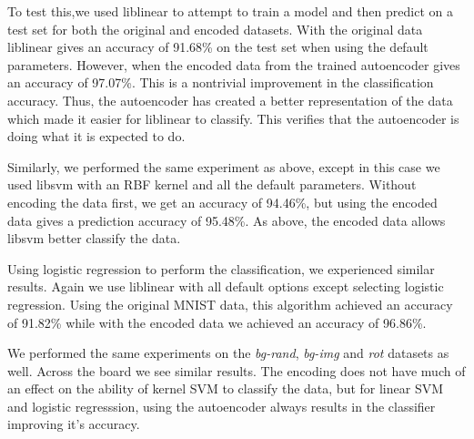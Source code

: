 To test this,we used liblinear to attempt to train a model and then predict on
a test set for both the original and encoded datasets. With the original data
liblinear gives an accuracy of 91.68\% on the test set when using the default
parameters. However, when the encoded data from the trained autoencoder gives
an accuracy of 97.07\%. This is a nontrivial improvement in the classification
accuracy. Thus, the autoencoder has created a better representation of the data
which made it easier for liblinear to classify. This verifies that the
autoencoder is doing what it is expected to do.

Similarly, we performed the same experiment as above, except in this case we
used libsvm with an RBF kernel and all the default parameters.  Without
encoding the data first, we get an accuracy of 94.46\%, but using the encoded
data gives a prediction accuracy of 95.48\%. As above, the encoded data allows libsvm
better classify the data.

Using logistic regression to perform the classification, we experienced similar results.
Again we use liblinear with all default options except selecting logistic regression. Using the
original MNIST data, this algorithm achieved an accuracy of 91.82\% while with the encoded data
we achieved an accuracy of 96.86\%.

We performed the same experiments on the \textit{bg-rand}, \textit{bg-img} and 
\textit{rot} datasets as well. Across the board we see similar results. The encoding does not have much of
an effect on the ability of kernel SVM to classify the data, but for linear SVM and logistic regresssion, 
using the autoencoder always results in the classifier improving it's accuracy. 


